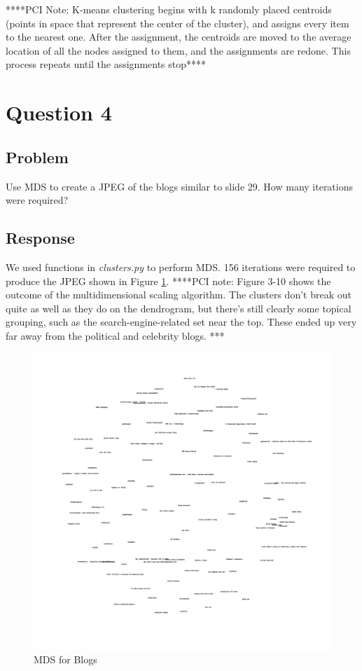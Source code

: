 \documentclass[letterpaper,11pt]{report}
\begin{document}
\begin{savenotes}
****PCI Note: K-means clustering begins with k randomly placed centroids (points in space that represent the center of the cluster), and assigns every item to the nearest one. After the  assignment,  the  centroids  are  moved  to  the  average  location  of  all  the  nodes assigned to them, and the assignments are redone. This process repeats until the assignments stop****

\section{Question 4}
\subsection{Problem}Use MDS to create a JPEG of the blogs similar to slide 29.  How many iterations were required?

\subsection{Response}We used functions in \emph{clusters.py} to perform MDS. 156 iterations were required to produce the JPEG shown in Figure \ref{fig:blogs2d}.
****PCI note: Figure 3-10 shows the outcome of the multidimensional scaling algorithm. The clusters don’t break out quite as well as they do on the dendrogram, but there’s still clearly  some  topical  grouping,  such  as  the  search-engine-related  set  near  the  top. These ended up very far away from the political and celebrity blogs. ***

\begin{figure}[htbp]
	\centering
		\includegraphics[width=1.00\textwidth]{blogs2d.jpg}
	\caption{MDS for Blogs}
	\label{fig:blogs2d}
\end{figure}


\end{savenotes}
\end{document}
